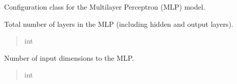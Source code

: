 \documentclass[letterpaper,10pt,english]{sphinxmanual}
\begin{document}
\begin{fulllineitems}
\begin{fulllineitems}
\begin{quote}
\begin{description}
\end{description}\end{quote}

\end{fulllineitems}


\end{fulllineitems}


\begin{fulllineitems}
\label{\detokenize{api:hypyml.configs.MLPConfig}}
\pysigstartsignatures
{}
\pysigstopsignatures
\sphinxAtStartPar
Configuration class for the Multilayer Perceptron (MLP) model.

\begin{fulllineitems}
\label{\detokenize{api:hypyml.configs.MLPConfig.layers}}
\pysigstartsignatures
{}
\pysigstopsignatures
\sphinxAtStartPar
Total number of layers in the MLP (including hidden and output layers).
\begin{quote}\begin{description}
\sphinxAtStartPar
int

\end{description}\end{quote}

\end{fulllineitems}


\begin{fulllineitems}
\label{\detokenize{api:hypyml.configs.MLPConfig.num_input_dim}}
\pysigstartsignatures
{}
\pysigstopsignatures
\sphinxAtStartPar
Number of input dimensions to the MLP.
\begin{quote}\begin{description}
\sphinxAtStartPar
int


\end{description}
\end{quote}
\end{fulllineitems}
\end{fulllineitems}
\end{document}
